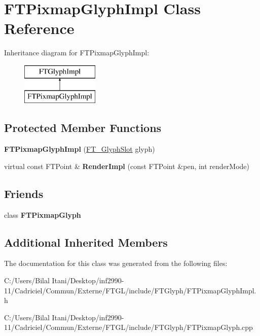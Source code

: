 \hypertarget{class_f_t_pixmap_glyph_impl}{}\section{F\+T\+Pixmap\+Glyph\+Impl Class Reference}
\label{class_f_t_pixmap_glyph_impl}
Inheritance diagram for F\+T\+Pixmap\+Glyph\+Impl\+:\begin{figure}[H]
\begin{center}
\leavevmode
\includegraphics[height=2.000000cm]{class_f_t_pixmap_glyph_impl}
\end{center}
\end{figure}
\subsection*{Protected Member Functions}
\begin{DoxyCompactItemize}
\item 
{\bfseries F\+T\+Pixmap\+Glyph\+Impl} (\hyperlink{struct_f_t___glyph_slot_rec__}{F\+T\+\_\+\+Glyph\+Slot} glyph)\hypertarget{class_f_t_pixmap_glyph_impl_a65e1773b7c1f422abbccd90399cd3ec4}{}\label{class_f_t_pixmap_glyph_impl_a65e1773b7c1f422abbccd90399cd3ec4}

\item 
virtual const F\+T\+Point \& {\bfseries Render\+Impl} (const F\+T\+Point \&pen, int render\+Mode)\hypertarget{class_f_t_pixmap_glyph_impl_a9c5cf9105b59301f0b27cfa2350012c6}{}\label{class_f_t_pixmap_glyph_impl_a9c5cf9105b59301f0b27cfa2350012c6}

\end{DoxyCompactItemize}
\subsection*{Friends}
\begin{DoxyCompactItemize}
\item 
class {\bfseries F\+T\+Pixmap\+Glyph}\hypertarget{class_f_t_pixmap_glyph_impl_ab141fccf761e39b9e4bec64cda0507a7}{}\label{class_f_t_pixmap_glyph_impl_ab141fccf761e39b9e4bec64cda0507a7}

\end{DoxyCompactItemize}
\subsection*{Additional Inherited Members}


The documentation for this class was generated from the following files\+:\begin{DoxyCompactItemize}
\item 
C\+:/\+Users/\+Bilal Itani/\+Desktop/inf2990-\/11/\+Cadriciel/\+Commun/\+Externe/\+F\+T\+G\+L/include/\+F\+T\+Glyph/F\+T\+Pixmap\+Glyph\+Impl.\+h\item 
C\+:/\+Users/\+Bilal Itani/\+Desktop/inf2990-\/11/\+Cadriciel/\+Commun/\+Externe/\+F\+T\+G\+L/include/\+F\+T\+Glyph/F\+T\+Pixmap\+Glyph.\+cpp\end{DoxyCompactItemize}
